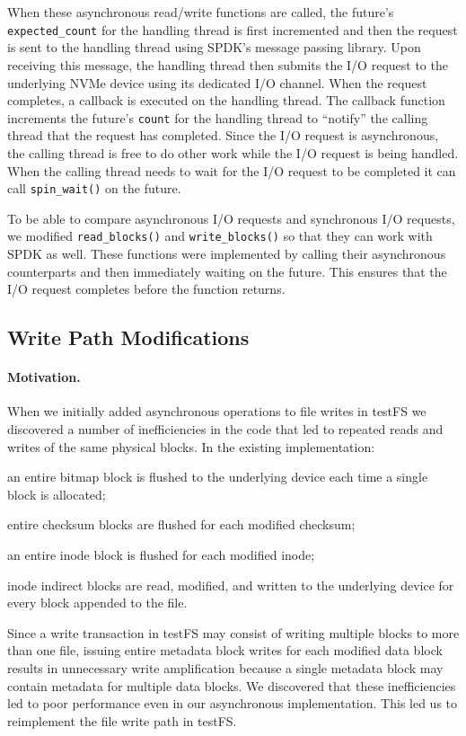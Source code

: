 When these asynchronous read/write functions are called, the future's {\tt
expected\_count} for the handling thread is first incremented and then the
request is sent to the handling thread using SPDK's message passing library.
Upon receiving this message, the handling thread then submits the I/O request
to the underlying NVMe device using its dedicated I/O channel. When the request
completes, a callback is executed on the handling thread. The callback function
increments the future's {\tt count} for the handling thread to ``notify'' the
calling thread that the request has completed. Since the I/O request is
asynchronous, the calling thread is free to do other work while the I/O request
is being handled. When the calling thread needs to wait for the I/O request to
be completed it can call {\tt spin\_wait()} on the future.

To be able to compare asynchronous I/O requests and synchronous I/O
requests, we modified {\tt read\_blocks()} and {\tt write\_blocks()} so that
they can work with SPDK as well. These functions were implemented by calling
their asynchronous counterparts and then immediately waiting on the future.
This ensures that the I/O request completes before the function returns.

\subsection{Write Path Modifications}
\paragraph{Motivation.}
When we initially added asynchronous operations to file writes in testFS we
discovered a number of inefficiencies in the code that led to repeated reads
and writes of the same physical blocks. In the existing implementation:
\begin{enumerate*}[label={(\roman*)}]
  \item an entire bitmap block is flushed to the underlying device each time a
    single block is allocated;
  \item entire checksum blocks are flushed for each modified checksum;
  \item an entire inode block is flushed for each modified inode;
  \item inode indirect blocks are read, modified, and written to the underlying
    device for every block appended to the file.
\end{enumerate*}
Since a write transaction in testFS may consist of writing multiple blocks to
more than one file, issuing entire metadata block writes for each modified data
block results in unnecessary write amplification because a single metadata
block may contain metadata for multiple data blocks. We discovered that these
inefficiencies led to poor performance even in our asynchronous implementation.
This led us to reimplement the file write path in testFS.

